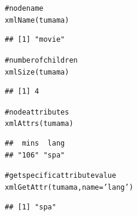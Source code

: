 \documentclass{beamer}\usepackage[]{graphicx}\usepackage[]{color}
\makeatletter
\newcommand{\hlstr}[1]{\textcolor[rgb]{0.063,0.58,0.627}{#1}}%
\newcommand{\hlcom}[1]{\textcolor[rgb]{0.588,0.588,0.588}{#1}}%
\newcommand{\hlstd}[1]{\textcolor[rgb]{0.196,0.196,0.196}{#1}}%
\newcommand{\hlkwc}[1]{\textcolor[rgb]{0,0.631,0.314}{#1}}%
\newcommand{\hlkwd}[1]{\textcolor[rgb]{0.78,0.227,0.412}{#1}}%
\newenvironment{kframe}{%
 \def\at@end@of@kframe{}%
 \ifinner\ifhmode%
  \def\at@end@of@kframe{\end{minipage}}%
  \begin{minipage}{\columnwidth}%
 \fi\fi%
 \def\FrameCommand##1{\hskip\@totalleftmargin \hskip-\fboxsep
 \colorbox{shadecolor}{##1}\hskip-\fboxsep
     \hskip-\linewidth \hskip-\@totalleftmargin \hskip\columnwidth}%
 \MakeFramed {\advance\hsize-\width
   \@totalleftmargin\z@ \linewidth\hsize
   \@setminipage}}%
 {\par\unskip\endMakeFramed%
 \at@end@of@kframe}
\newenvironment{knitrout}{}{} %
\makeatother
\begin{document}
\begin{frame}[fragile]
\begin{columns}[t]
\begin{column}{0.5\textwidth}
\begin{knitrout}\tiny
{}\color{fgcolor}\begin{kframe}
\begin{alltt}
\hlcom{# node name}
\hlkwd{xmlName}\hlstd{(tumama)}
\end{alltt}
\begin{verbatim}
## [1] "movie"
\end{verbatim}
\begin{alltt}
\hlcom{# number of children}
\hlkwd{xmlSize}\hlstd{(tumama)}
\end{alltt}
\begin{verbatim}
## [1] 4
\end{verbatim}
\begin{alltt}
\hlcom{# node attributes}
\hlkwd{xmlAttrs}\hlstd{(tumama)}
\end{alltt}
\begin{verbatim}
##  mins  lang 
## "106" "spa"
\end{verbatim}
\begin{alltt}
\hlcom{# get specific attribute value}
\hlkwd{xmlGetAttr}\hlstd{(tumama,} \hlkwc{name} \hlstd{=} \hlstr{'lang'}\hlstd{)}
\end{alltt}
\begin{verbatim}
## [1] "spa"
\end{verbatim}
\end{kframe}
\end{knitrout}
\end{column}
\end{columns}

\end{frame}

\end{document}
